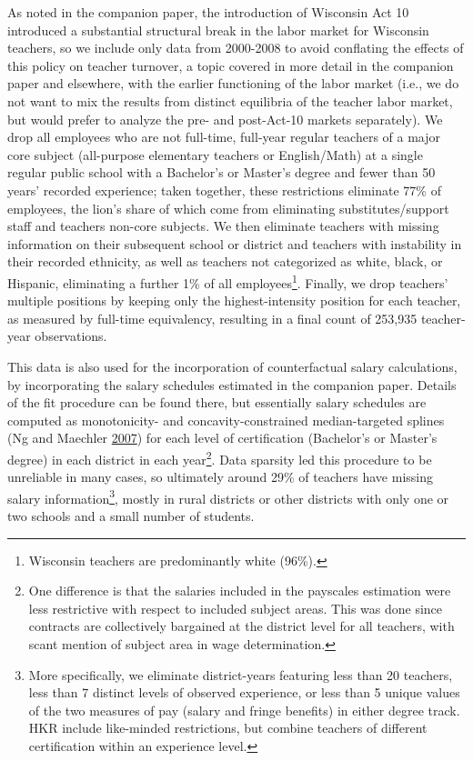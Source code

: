 \documentclass[]{article}
\let\rmarkdownfootnote\footnote%
\def\footnote{\protect\rmarkdownfootnote}
\begin{document}
As noted in the companion paper, the introduction of Wisconsin Act 10
introduced a substantial structural break in the labor market for
Wisconsin teachers, so we include only data from 2000-2008 to avoid
conflating the effects of this policy on teacher turnover, a topic
covered in more detail in the companion paper and elsewhere, with the
earlier functioning of the labor market (i.e., we do not want to mix the
results from distinct equilibria of the teacher labor market, but would
prefer to analyze the pre- and post-Act-10 markets separately). We drop
all employees who are not full-time, full-year regular teachers of a
major core subject (all-purpose elementary teachers or English/Math) at
a single regular public school with a Bachelor's or Master's degree and
fewer than 50 years' recorded experience; taken together, these
restrictions eliminate 77\% of employees, the lion's share of which come
from eliminating substitutes/support staff and teachers non-core
subjects. We then eliminate teachers with missing information on their
subsequent school or district and teachers with instability in their
recorded ethnicity, as well as teachers not categorized as white, black,
or Hispanic, eliminating a further 1\% of all employees\footnote{Wisconsin
  teachers are predominantly white (96\%).}. Finally, we drop teachers'
multiple positions by keeping only the highest-intensity position for
each teacher, as measured by full-time equivalency, resulting in a final
count of 253,935 teacher-year observations.

This data is also used for the incorporation of counterfactual salary
calculations, by incorporating the salary schedules estimated in the
companion paper. Details of the fit procedure can be found there, but
essentially salary schedules are computed as monotonicity- and
concavity-constrained median-targeted splines (Ng and Maechler
\protect\hyperlink{ref-ng}{2007}) for each level of certification
(Bachelor's or Master's degree) in each district in each year\footnote{One
  difference is that the salaries included in the payscales estimation
  were less restrictive with respect to included subject areas. This was
  done since contracts are collectively bargained at the district level
  for all teachers, with scant mention of subject area in wage
  determination.}. Data sparsity led this procedure to be unreliable in
many cases, so ultimately around 29\% of teachers have missing salary
information\footnote{More specifically, we eliminate district-years
  featuring less than 20 teachers, less than 7 distinct levels of
  observed experience, or less than 5 unique values of the two measures
  of pay (salary and fringe benefits) in either degree track. HKR
  include like-minded restrictions, but combine teachers of different
  certification within an experience level.}, mostly in rural districts
or other districts with only one or two schools and a small number of
students.
\end{document}
